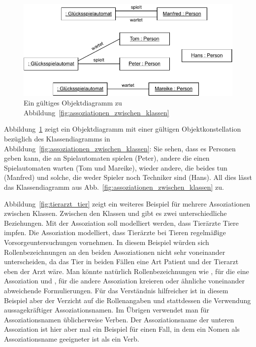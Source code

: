 \begin{figure}[h!]
	\centering
	\includegraphics{Bilder/Kapitel-4/assoziationen_zwischen_klassen_objektdiagramm.pdf}
	\caption[Ein gültiges Objektdiagramm zu Abb.~\ref{fig:assoziationen_zwischen_klassen}]{Ein gültiges Objektdiagramm zu Abbildung~\ref{fig:assoziationen_zwischen_klassen}}
	\label{fig:objektdiagramm_zu_assoziationen_zwischen_klassen}
\end{figure}

Abbildung~\ref{fig:objektdiagramm_zu_assoziationen_zwischen_klassen} zeigt ein Objektdiagramm mit einer gültigen Objektkonstellation bezüglich des Klassendiagramms in Abbildung~\ref{fig:assoziationen_zwischen_klassen}: Sie sehen, dass es Personen geben kann, die an Spielautomaten spielen (Peter), andere die einen Spielautomaten warten (Tom und Mareike), wieder andere, die beides tun (Manfred) und solche, die weder Spieler noch Techniker sind (Hans). All dies lässt das Klassendiagramm aus Abb.~\ref{fig:assoziationen_zwischen_klassen} zu.

\pagebreak %

Abbildung~\ref{fig:tierarzt_tier} zeigt ein weiteres Beispiel für mehrere Assoziationen zwischen Klassen. Zwischen den Klassen  und  gibt es zwei unterschiedliche Beziehungen. Mit der Assoziation  soll modelliert werden, dass Tierärzte Tiere impfen. Die Assoziation  modelliert, dass Tierärzte bei Tieren regelmäßige Vorsorgeuntersuchungen vornehmen. In diesem Beispiel würden sich Rollenbezeichnungen an den beiden Assoziationen nicht sehr voneinander unterscheiden, da das Tier in beiden Fällen eine Art Patient und der Tierarzt eben der Arzt wäre. Man könnte natürlich Rollenbezeichnungen wie ,  für die eine Assoziation und ,  für die andere Assoziation kreieren oder ähnliche voneinander abweichende Formulierungen. Für das Verständnis hilfreicher ist in diesem Beispiel aber der Verzicht auf die Rollenangaben und stattdessen die Verwendung aussagekräftiger Assoziationsnamen. Im Übrigen verwendet man für Assoziationsnamen üblicherweise Verben. Der Assoziationsname  der unteren Assoziation ist hier aber mal ein Beispiel für einen Fall, in dem ein Nomen als Assoziationsname geeigneter ist als ein Verb.

